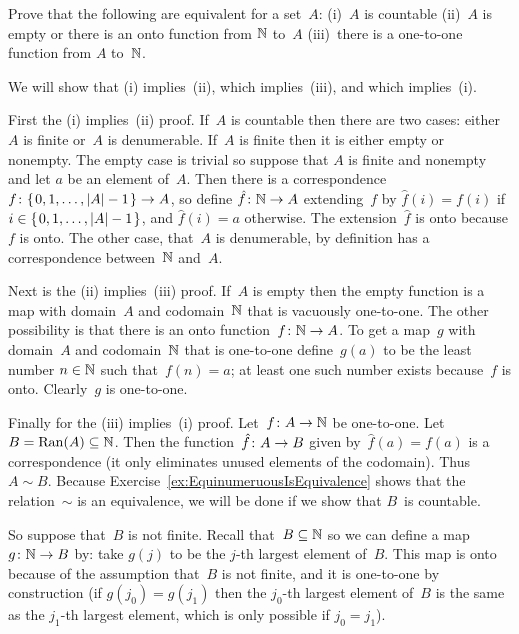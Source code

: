 \begin{problem} \label{ex:OntoFromNatsToSetEquivToCountable}
Prove that the following are equivalent for a set~$A$:
(i)~$A$ is countable
(ii)~$A$ is empty or there is an onto function from $\mathbb{N}$ to~$A$
(iii)~there is a one-to-one function from $A$ to~$\mathbb{N}$.    
\begin{answer}
We will show that (i) implies~(ii), which implies~(iii), and which
implies~(i).

First the (i) implies~(ii) proof.
If~$A$ is countable then there are two cases: either~$A$ is finite 
or~$A$ is denumerable.
If~$A$ is finite then it is either empty or nonempty.
The empty case is trivial so suppose that $A$ is finite and nonempty
and let $a$ be an element of~$A$.
Then there is a correspondence~$\mbox{$f\colon \mbox{$\{\hspace{0.1em}0,1,\ldots,|A|-1\hspace{0.1em}\}$}\to A$}$,
so define $\mbox{$\hat{f}\colon \mathbb{N}\to A$}$ extending~$f$ by
$\hat{f}(i)=f(i)$ if $i\in\mbox{$\{\hspace{0.1em}0,1,\ldots,|A|-1\hspace{0.1em}\}$}$, and 
$\hat{f}(i)=a$ otherwise.
The extension~$\hat{f}$ is onto because $f$ is onto.
The other case, that~$A$ is denumerable, by definition has a 
correspondence between~$\mathbb{N}$ and~$A$.

Next is the (ii) implies~(iii) proof.
If~$A$ is empty then the empty function is a map with domain~$A$ and
codomain~$\mathbb{N}$ that is vacuously one-to-one.
The other possibility is that there is an onto function~$\mbox{$f\colon \mathbb{N}\to A$}$.
To get a map~$g$ with domain~$A$ and codomain~$\mathbb{N}$ that is one-to-one
define~$g(a)$ to be the least number $n\in\mathbb{N}$ such that~$f(n)=a$; 
at least one such number exists because~$f$ is onto.
Clearly~$g$ is one-to-one.

Finally for the (iii) implies~(i) proof.
Let~$\mbox{$f\colon A\to \mathbb{N}$}$ be one-to-one.
Let $B=\operatorname{Ran}(A)\subseteq\mathbb{N}$.
Then the function~$\mbox{$\hat{f}\colon A\to B$}$ given by~$\hat{f}(a)=f(a)$ is a 
correspondence (it only eliminates unused elements of the codomain).
Thus $A\sim B$.
Because Exercise~\ref{ex:EquinumeruousIsEquivalence} shows that the 
relation~$\sim$ is an equivalence, we will be done if we show that $B$~is
countable.

So suppose that~$B$ is not finite.
Recall that~$B\subseteq\mathbb{N}$ so we can define a map
$\mbox{$g\colon \mathbb{N}\to B$}$ by:
take $g(j)$ to be the $j$-th largest element of~$B$.
This map is onto because of the assumption that~$B$ is not finite, and it 
is one-to-one by construction (if $g(j_0)=g(j_1)$ then the $j_0$-th largest
element of~$B$ is the same as the $j_1$-th largest element, which is only
possible if $j_0=j_1$).
\end{answer}
\end{problem}

